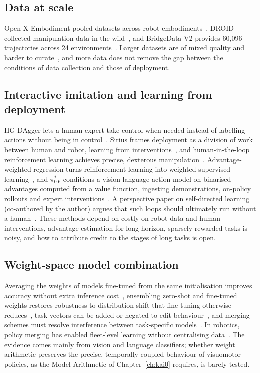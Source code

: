 \subsection{Data at scale}

Open X-Embodiment pooled datasets across robot embodiments~\cite{oneill2024openx}, DROID collected manipulation data in the wild~\cite{khazatsky2024droid}, and BridgeData V2 provides 60,096 trajectories across 24 environments~\cite{walke2023bridgedata}. Larger datasets are of mixed quality and harder to curate~\cite{nakamoto2024vgps}, and more data does not remove the gap between the conditions of data collection and those of deployment.

\subsection{Interactive imitation and learning from deployment}

HG-DAgger lets a human expert take control when needed instead of labelling actions without being in control~\cite{kelly2019hgdagger}. Sirius frames deployment as a division of work between human and robot, learning from interventions~\cite{liu2023robotjob}, and human-in-the-loop reinforcement learning achieves precise, dexterous manipulation~\cite{luo2025hilserl}. Advantage-weighted regression turns reinforcement learning into weighted supervised learning~\cite{peng2019awr}, and $\pi^{*}_{0.6}$ conditions a vision-language-action model on binarised advantages computed from a value function, ingesting demonstrations, on-policy rollouts and expert interventions~\cite{amin2026pistar06}. A perspective paper on self-directed learning (co-authored by the author) argues that such loops should ultimately run without a human~\cite{chen2025robot}. These methods depend on costly on-robot data and human interventions, advantage estimation for long-horizon, sparsely rewarded tasks is noisy, and how to attribute credit to the stages of long tasks is open.

\subsection{Weight-space model combination}

Averaging the weights of models fine-tuned from the same initialisation improves accuracy without extra inference cost~\cite{wortsman2022soups}, ensembling zero-shot and fine-tuned weights restores robustness to distribution shift that fine-tuning otherwise reduces~\cite{wortsman2022wiseft}, task vectors can be added or negated to edit behaviour~\cite{ilharco2023task}, and merging schemes must resolve interference between task-specific models~\cite{yadav2023ties}. In robotics, policy merging has enabled fleet-level learning without centralising data~\cite{wang2024fleet}. The evidence comes mainly from vision and language classifiers; whether weight arithmetic preserves the precise, temporally coupled behaviour of visuomotor policies, as the Model Arithmetic of Chapter~\ref{ch:kai0} requires, is barely tested.

